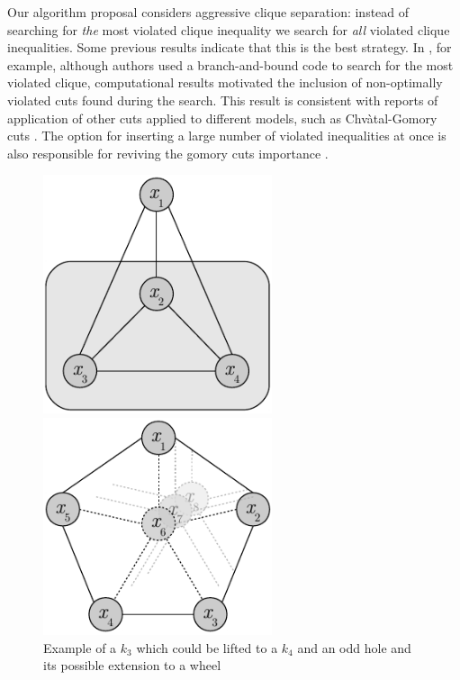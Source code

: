 \documentclass{endm}
\begin{document}
Our algorithm proposal considers aggressive clique separation: instead of searching for \emph{the} most violated clique inequality we search for \emph{all} violated clique inequalities. Some previous results indicate that this is the best strategy. In \cite{Marecek2012}, for example, although authors used a branch-and-bound code to search for the most violated clique, computational results motivated the inclusion of non-optimally violated cuts found during the search. This result is consistent with reports of application of other cuts applied to different models, such as {C}hv\`{a}tal-Gomory cuts \cite{Fischetti2007}. The option for inserting a large number of violated inequalities at once is also responsible for reviving the gomory cuts importance \cite {Cornuejols2007}.

\begin{figure}	
	\begin{minipage}[h]{.5\textwidth}
		\begin{center}
			\includegraphics[width=0.6\textwidth]{clique.pdf}
		\end{center}
	\end{minipage}
	\begin{minipage}[h]{.5\textwidth}
		\begin{center}
			\includegraphics[width=0.6\textwidth]{oddHole.pdf}
		\end{center}
	\end{minipage}
	\caption{Example of a $k_{3}$ which could be lifted to a $k_{4}$    and an odd hole and its possible extension to a wheel} \label{figLiftings}
\end{figure}
\end{document}
